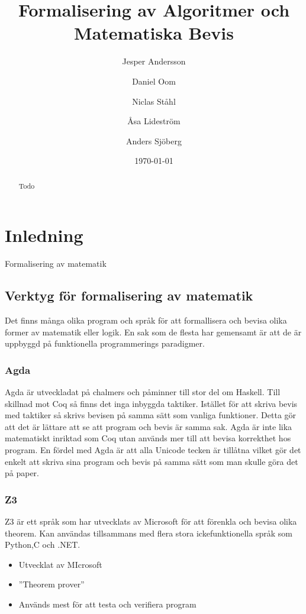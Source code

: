 \documentclass[a4paper]{article}
\title{Formalisering av Algoritmer och Matematiska Bevis}
\author[1]{Jesper Andersson}
\author[1]{Daniel Oom}
\author[1]{Niclas Ståhl}
\author[2]{Åsa Lideström}
\author[2]{Anders Sjöberg}
\affil[1]{Datateknik, Chalmers}
\affil[2]{Mattematik, Göteborgs Universitet}
\date{\today}
\begin{document}
\begin{abstract}
Todo
\end{abstract}

\maketitle
\thispagestyle{empty}
\newpage
\tableofcontents
\newpage

\section{Inledning}
Formalisering av matematik

\subsection{Verktyg för formalisering av matematik}
Det finns många olika program och språk för att formallisera och bevisa
olika former av matematik eller logik. En sak som de flesta har gemensamt är
att de är uppbyggd på funktionella programmerings paradigmer.

\subsubsection{Agda}
Agda är utveckladat på chalmers och påminner till stor del om Haskell. Till
skillnad mot Coq så finns det inga inbyggda taktiker. Istället för att skriva
bevis med taktiker så skrivs bevisen på samma sätt som vanliga funktioner.
Detta gör att det är lättare att se att program och bevis är samma sak. Agda är
inte lika matematiskt inriktad som Coq utan används mer till att bevisa
korrekthet hos program. En fördel med Agda är att alla Unicode tecken är
tillåtna vilket gör det enkelt att skriva sina program och bevis på samma sätt
som man skulle göra det på paper.

\subsubsection{Z3}
Z3 är ett språk som har utvecklats av Microsoft för att förenkla och bevisa
olika theorem. Kan användas tillsammans med flera stora ickefunktionella språk
som Python,C och .NET.

\begin{itemize}
  \item Utvecklat av MIcrosoft
  \item ''Theorem prover''
  \item Används mest för att testa och verifiera program
\end{itemize}
\end{document}
